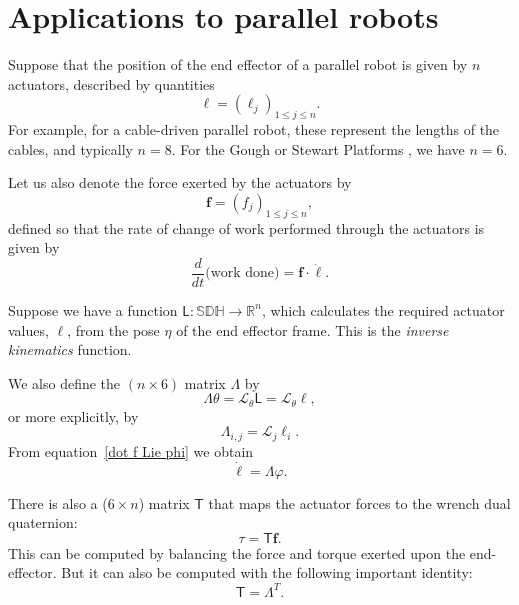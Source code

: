 \documentclass[reqno,12pt]{amsart}
\newcommand\setunitdualquat{\mathbb S\mathbb D\mathbb H}
\newcommand{\liederiv}{\mathcal L}
\begin{document}
\section{Applications to parallel robots}

Suppose that the position of the end effector of a parallel robot is given by $n$ actuators, described by quantities
\begin{equation}
\bm \ell = (\ell_j)_{1 \le j \le n} .
\end{equation}
For example, for a cable-driven parallel robot, these represent the lengths of the cables, and typically $n = 8$.  For the Gough or Stewart Platforms \cite{gallardo-alvarado}, we have $n = 6$.

Let us also denote the force exerted by the actuators by 
\begin{equation}
\bm f = (f_j)_{1 \le j \le n} ,
\end{equation}
defined so that the rate of change of work performed through the actuators is given by
\begin{equation}
\label{dot h f ell}
\frac{d}{dt} \text{(work done)} = \bm f \cdot \dot{\bm\ell} .
\end{equation}

Suppose we have a function $\mathsf L : \setunitdualquat \to \mathbb R^n$, which calculates the required actuator values, $\bm \ell$, from the pose $\eta$ of the end effector frame.  This is the \emph{inverse kinematics} function.

We also define the $(n \times 6)$ matrix $\mathsf \Lambda$ by
\begin{equation}
\label{Lambda}
\mathsf \Lambda \theta = \liederiv_\theta \mathsf L = \liederiv_\theta \bm \ell ,
\end{equation}
or more explicitly, by
\begin{equation}
\mathsf \Lambda_{i,j} = \liederiv_j \mathsf \ell_i .
\end{equation}
From equation~\eqref{dot f Lie phi} we obtain
\begin{equation}
\label{dot l Lambda phi}
\dot{\bm \ell} = \mathsf \Lambda \varphi .
\end{equation}

There is also a ($6 \times n$) matrix $\mathsf T$ that maps the actuator forces to the wrench dual quaternion:
\begin{equation}
\label{T}
\tau = \mathsf T \bm f .
\end{equation}
This can be computed by balancing the force and torque exerted upon the end-effector.  But it can also be computed with the following important identity:
\begin{equation}
\label{T=L^T}
\mathsf T = \mathsf \Lambda^T.
\end{equation}
\end{document}
